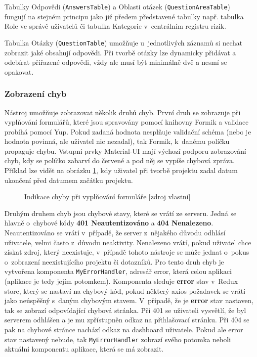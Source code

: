 Tabulky Odpovědi (\texttt{AnswersTable}) a Oblasti otázek (\texttt{QuestionAreaTable}) fungují na stejném principu jako již předem představené tabulky např. tabulka Role ve správě uživatelů či tabulka Kategorie v~centrálním registru rizik.

Tabulka Otázky (\texttt{QuestionTable}) umožňuje u~jednotlivých záznamů si nechat zobrazit jaké obsahují odpovědi. Při tvorbě otázky lze dynamicky přidávat a odebírat přiřazené odpovědi, vždy ale musí být minimálně dvě a nesmí se opakovat.


\subsubsection *{Zobrazení chyb}

Nástroj umožňuje zobrazovat několik druhů chyb. První druh se zobrazuje při vyplňování formulářů, které jsou spravovány pomocí knihovny Formik a validace probíhá pomocí Yup. Pokud zadaná hodnota nesplňuje validační schéma (nebo je hodnota povinná, ale uživatel nic nezadal), tak Formik, k~danému políčku propaguje chybu. Vstupní prvky Material-UI mají výchozí podporu zobrazování chyb, kdy se políčko zabarví do červené a pod něj se vypíše chybová zpráva. Příklad lze vidět na obrázku \ref{fromikErr}, kdy uživatel při tvorbě projektu zadal datum ukončení před datumem začátku projektu.

    \begin{figure}[!h]
    \begin{center}
    \caption{Indikace chyby při vyplňování formuláře [zdroj vlastní]}
    \label{fromikErr}
    \end{center}
    \end{figure}
    
Druhým druhem chyb jsou chybové stavy, které se vrátí ze serveru. Jedná se hlavně o~chybové kódy \textbf{401 Neautentizováno} a \textbf{404 Nenalezeno}. Neautentizováno se vrátí v~případě, že server z~nějakého důvodu odhlásí uživatele, velmi často z~důvodu neaktivity. Nenalezeno vrátí, pokud uživatel chce získat zdroj, který neexistuje, v~případě tohoto nástroje se může jednat o~pokus o~zobrazení neexistujícího projektu či dotazníků. Pro tento druh chyb je vytvořena komponenta \texttt{MyErrorHandler}, adresář error, která  celou aplikaci (aplikace je tedy jejím potomkem). Komponenta sleduje \textbf{error} stav v~Redux store, který se nastaví na chybový kód, pokud některý axios požadavek se vrátí jako neúspěšný s~daným chybovým stavem. V~případě, že je \textbf{error} stav nastaven, tak se zobrazí odpovídající chybová stránka. Při 401 se uživateli vysvětlí, že byl serverem odhlášen a je mu zpřístupněn odkaz na přihlašovací stránku. Při 404 se pak na chybové stránce nachází odkaz na dashboard uživatele. Pokud ale error stav nastavený nebude, tak \texttt{MyErrorHandler} zobrazí svého potomka neboli aktuální komponentu aplikace, která se má zobrazit.


